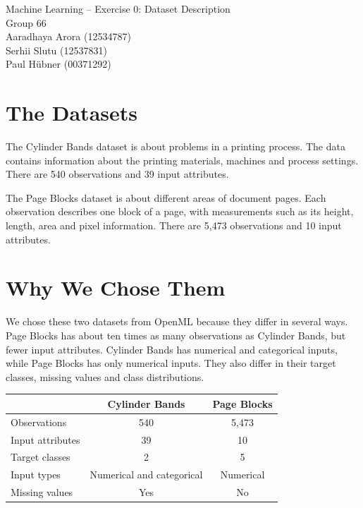 \documentclass[10pt,a4paper]{article}
\begin{document}
\begin{center}
{\large Machine Learning -- Exercise 0: Dataset Description}\\[5pt]
Group 66\\[3pt]
Aaradhaya Arora (12534787)\\
Serhii Slutu (12537831)\\
Paul H\"ubner (00371292)
\end{center}

\vspace{-5pt}

\section{The Datasets}
The Cylinder Bands dataset is about problems in a printing process. The data contains information about the printing materials, machines and process settings. There are 540 observations and 39 input attributes.

The Page Blocks dataset is about different areas of document pages. Each observation describes one block of a page, with measurements such as its height, length, area and pixel information. There are 5,473 observations and 10 input attributes.

\section{Why We Chose Them}
We chose these two datasets from OpenML because they differ in several ways. Page Blocks has about ten times as many observations as Cylinder Bands, but fewer input attributes. Cylinder Bands has numerical and categorical inputs, while Page Blocks has only numerical inputs. They also differ in their target classes, missing values and class distributions.

\begin{center}
\begin{tabular}{lcc}
\toprule
 & Cylinder Bands & Page Blocks \\
\midrule
Observations & 540 & 5,473 \\
Input attributes & 39 & 10 \\
Target classes & 2 & 5 \\
Input types & Numerical and categorical & Numerical \\
Missing values & Yes & No \\
\bottomrule
\end{tabular}
\end{center}
\end{document}
